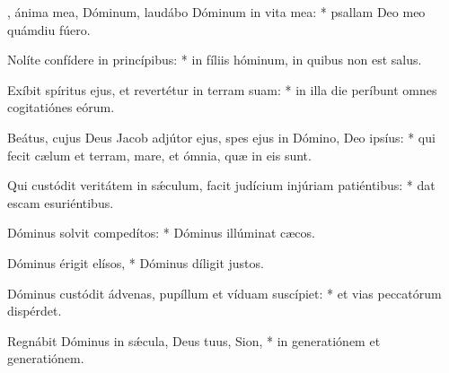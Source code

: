 \begin{psalmus}

, ánima mea, Dóminum, laudábo Dóminum in vita mea: * psallam Deo meo quámdiu fúero.

Nolíte confídere in princípibus: * in fíliis hóminum, in quibus non est salus.

Exíbit spíritus ejus, et revertétur in terram suam: * in illa die períbunt omnes cogitatiónes eórum.

Beátus, cujus Deus Jacob adjútor ejus, spes ejus in Dómino, Deo ipsíus: * qui fecit cælum et terram, mare, et ómnia, quæ in eis sunt.

Qui custódit veritátem in sǽculum, facit judícium injúriam patiéntibus: * dat escam esuriéntibus.

Dóminus solvit compedítos: * Dóminus illúminat cæcos.

Dóminus érigit elísos, * Dóminus díligit justos.

Dóminus custódit ádvenas, pupíllum et víduam suscípiet: * et vias peccatórum dispérdet.

Regnábit Dóminus in sǽcula, Deus tuus, Sion, * in generatiónem et generatiónem.

\end{psalmus}
